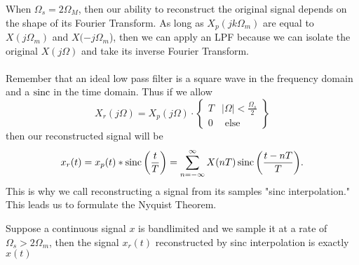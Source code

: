 When $\Omega_s = 2\Omega_M$, then our ability to reconstruct the original signal depends on the shape of its Fourier Transform. As long as $X_p(jk\Omega_m)$
are equal to $X(j\Omega_m)$ and $X(-j\Omega_m$), then we can apply an LPF because we can isolate the original $X(j\Omega)$ and take its inverse Fourier Transform.\\\\
Remember that an ideal low pass filter is a square wave in the frequency domain and a $\operatorname*{sinc}$ in the time domain. Thus if we allow
\[
    X_r(j\Omega) = X_p(j\Omega)\cdot \left\{
            \begin{array}{cc}
                T & |\Omega| < \frac{\Omega_s}{2}\\
                0 & \text{ else }
            \end{array}
        \right\}
\]
then our reconstructed signal will be
\[
  x_r(t) = x_p(t)*\operatorname*{sinc}\left(\frac{t}{T}\right) = \sum_{n=-\infty}^{\infty}{X(nT)\operatorname*{sinc}\left(\frac{t-nT}{T}\right)}.
\]
This is why we call reconstructing a signal from its samples "sinc interpolation."
This leads us to formulate the Nyquist Theorem.
\begin{theorem}

  Suppose a continuous signal $x$ is bandlimited and we sample it at a rate of $\Omega_s > 2\Omega_m$, then the signal $x_r(t)$ reconstructed by sinc interpolation is exactly $x(t)$
  \label{thm:nyquist}
\end{theorem}
